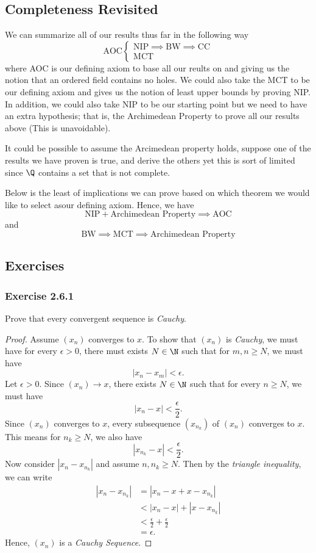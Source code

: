 \subsection{Completeness Revisited}

We can summarize all of our results thus far in the following way 
\[ \text{AOC} 
\begin{cases}
    \text{NIP} \implies \text{BW} \implies \text{CC} \\ 
    \text{MCT} 
\end{cases}   \]
where AOC is our defining axiom to base all our reults on and giving us the notion that an ordered field contains no holes. We could also take the MCT to be our defining axiom and gives us the notion of least upper bounds by proving NIP. In addition, we could also take NIP to be our starting point but we need to have an extra hypothesis; that is, the Archimedean Property to prove all our results above (This is unavoidable).

It could be possible to assume the Arcimedean property holds, suppose one of the results we have proven is true, and derive the others yet this is sort of limited since \( \Q \) contains a set that is not complete. 

Below is the least of implications we can prove based on which theorem we would like to select asour defining axiom. Hence, we have
\[ \text{NIP} + \text{Archimedean Property} \implies \text{AOC} \] and 
\[ \text{BW} \implies \text{MCT} \implies \text{Archimedean Property}\]

\subsection{Exercises}

\subsubsection{Exercise 2.6.1}
Prove that every convergent sequence is \textit{Cauchy}.
\begin{proof}
Assume \( (x_n)\) converges to \(x\). To show that \((x_n)\) is \textit{Cauchy}, we must have for every \( \epsilon > 0 \),  there must exists \( N \in \N \) such that for \( m,n \geq N \), we must have 
\[ |x_n - x_m| < \epsilon. \]
Let \( \epsilon > 0 \). Since \( (x_n) \to x \), there exists \( N \in \N \) such that for every \( n \geq N \), we must have 
\[ |x_n - x| < \frac{\epsilon}{2}. \]
Since \( (x_n)\) converges to \(x\), every subsequence \( (x_{n_k})\) of \((x_n)\) converges to \(x \). This means for \( n_k \geq N \), we also have 
\[ | x_{n_k} - x | < \frac{ \epsilon }{2}.\] 
Now consider \(|x_n - x_{n_k}| \) and assume \( n, n_k \geq N \). Then by the \textit{triangle inequality}, we can write 
\begin{align*}
    |x_n - x_{n_k}| &= |x_n - x + x - x_{n_k} | \\
                    &< |x_n - x| + |x - x_{n_k}| \\
               &< \frac{\epsilon}{2} + \frac{\epsilon }{2} \\
               &= \epsilon.
\end{align*}
Hence, \((x_n)\) is a \textit{Cauchy Sequence}. 
\end{proof}

